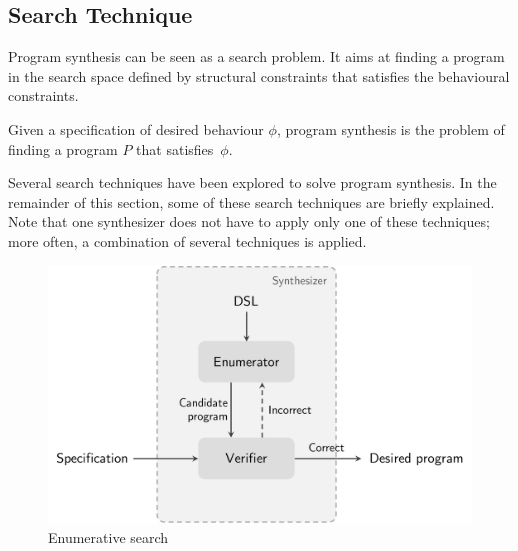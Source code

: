 
\subsection{Search Technique}\label{sec:search-technique}

Program synthesis can be seen as a search problem. It aims at finding a program in the search space defined by structural constraints that satisfies the behavioural constraints.

\begin{definition}
Given a specification of desired behaviour \(\phi\), program synthesis is the problem of finding a program \(P\) that satisfies~\(\phi\).
\end{definition}

\noindent
Several search techniques have been explored to solve program synthesis. In the remainder of this section, some of these search techniques are briefly explained. Note that one synthesizer does not have to apply only one of these techniques; more often, a combination of several techniques is applied.

\begin{figure}
    \centering
    \includegraphics[scale=.35]{pictures/enumerative_search.pdf}
    \caption{Enumerative search}
    \label{fig:enumerative_search}
\end{figure}

